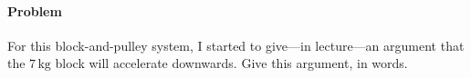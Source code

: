 \documentclass[12pt]{article}
\newcommand{\kg}{\mathrm{kg}}
\newcounter{problem}
\begin{document}
\paragraph{Problem~\theproblem}%
For this block-and-pulley system, I started to give---in lecture---an
argument that the $7\,\kg$ block will accelerate downwards.  Give this
argument, in words.
%

~ \vfill ~
\end{document}

